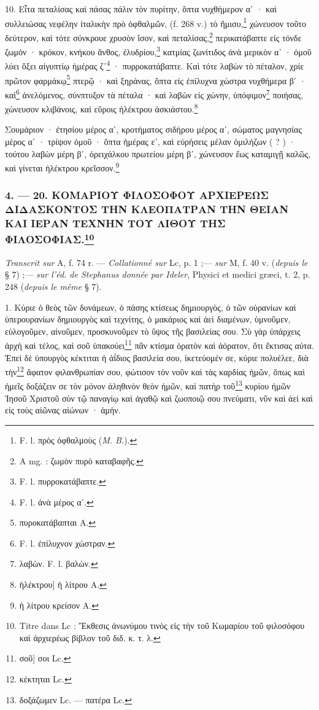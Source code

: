\documentclass[a4paper, 11pt, oneside, polutonikogreek, french]{article}
\begin{document}
10. Εἶτα πεταλίσας καὶ πάσας πάλιν τὸν πυρίτην, ὄπτα νυχθήμερον αʹ · καὶ συλλειώσας νεφέλην ἰταλικὴν πρὸ ὀφθαλμῶν, (f. 268 v.) τὸ ἥμισυ,\footnote{F. l. πρὸς ὀφθαλμοὺς (\emph{M. B.}).} χώνευσον τοῦτο δεύτερον, καὶ τότε σύνκρουε χρυσὸν ἴσον, καὶ πεταλίσας,\footnote{A mg. : ζωμὸν πυρὸ καταβαφῆς.} περικατάβαπτε εἰς τόνδε ζωμόν · κρόκον, κνήκου ἄνθος, ἐλυδρίου,\footnote{F. l. πυρροκατάβαπτε.} κατμίας ζωνίτιδος ἀνὰ μερικὸν αʹ · ὁμοῦ λύει ὄξει αἰγυπτίῳ ἡμέρας ζʹ\footnote{F. l. ἀνὰ μέρος αʹ.} · πυρροκατάβαπτε. Καὶ τότε λαβὼν τὸ πέταλον, χρίε πρῶτον φαρμάκῳ\footnote{πυροκατάβαπται A.} πτερῷ · καὶ ξηράνας, ὄπτα εἰς ἐπίλυχνα χώστρα νυχθήμερα βʹ · καὶ\footnote{F. l. ἐπίλυχνον χώστραν.} ἀνελόμενος, σύνπτυξον τὰ πέταλα · καὶ λαβὼν εἰς χώνην, ὑπόφιμον\footnote{λαβὼν. F. l. βαλὼν.} ποιήσας, χώνευσον κλιβάνοις, καὶ εὕροις ἠλέκτρου ἀσκιάστου.\footnote{ἠλέκτρου] ἡ λίτρου A.}

Σουμάριον · ἐτησίου μέρος αʹ, κροτήματος σιδήρου μέρος αʹ, σώματος μαγνησίας μέρος αʹ · τρίψον ὁμοῦ · ὄπτα ἡμέρας εʹ, καὶ εὑρήσεις μέλαν ὁμιλήζων ( ? ) · τούτου λαβὼν μέρη βʹ, ὀρειχάλκου πρωτείου μέρη βʹ, χώνευσον ἕως καταμιγῇ καλῶς, καὶ γίνεται ἠλέκτρου κρεῖσσον.\footnote{ἡ λίτρου κρείσον A.}

\bigskip
\centerline{\EightStarTaper}
\centerline{\EightStarTaper\EightStarTaper}
\bigskip

\subsubsection[4. --- 20. ΚΟΜΑΡΙΟΥ ΦΙΛΟΣΟΦΟΥ ΑΡΧΙΕΡΕΩΣ ΔΙΔΑΣΚΟΝΤΟΣ ΤΗΝ ΚΛΕΟΠΑΤΡΑΝ ΤΗΝ ΘΕΙΑΝ ΚΑΙ ΙΕΡΑΝ ΤΕΧΝΗΝ ΤΟΥ ΛΙΘΟΥ ΤΗΣ ΦΙΛΟΣΟΦΙΑΣ.]{4. --- 20. ΚΟΜΑΡΙΟΥ ΦΙΛΟΣΟΦΟΥ ΑΡΧΙΕΡΕΩΣ ΔΙΔΑΣΚΟΝΤΟΣ ΤΗΝ ΚΛΕΟΠΑΤΡΑΝ ΤΗΝ ΘΕΙΑΝ ΚΑΙ ΙΕΡΑΝ ΤΕΧΝΗΝ ΤΟΥ ΛΙΘΟΥ ΤΗΣ ΦΙΛΟΣΟΦΙΑΣ.\footnote{Titre dans Lc : Ἔκθεσις ἀνωνύμου τινὸς εἰς τὴν τοῦ Κωμαρίου τοῦ φιλοσόφου καὶ ἀρχιερέως βίβλον τοῦ διδ. κ. τ. λ.}}

\emph{Transcrit sur} A, f. 74 r. --- \emph{Collationné sur} Lc, p. 1 ;--- \emph{sur} M, f. 40 v. (\emph{depuis le} § 7) ;--- \emph{sur l'éd. de Stephanus donnée par Ideler}, Physici et medici græci, t. 2, p. 248 (\emph{depuis le même} § 7).

1. Κύριε ὁ θεὸς τῶν δυνάμεων, ὁ πάσης κτίσεως δημιουργὸς, ὁ τῶν οὐρανίων καὶ ὑπερουρανίων δημιουργὸς καὶ τεχνίτης, ὁ μακάριος καὶ ἀεὶ διαμένων, ὑμνοῦμεν, εὐλογοῦμεν, αἰνοῦμεν, προσκυνοῦμεν τὸ ὕψος τῆς βασιλείας σου. Σὺ γὰρ ὑπάρχεις ἀρχὴ καὶ τέλος, καὶ σοῦ ὑπακούει\footnote{σοῦ] σοι Lc.} πᾶν κτίσμα ὁρατὸν καὶ ἀόρατον, ὅτι ἔκτισας αὐτα. Ἐπεὶ δὲ ὑπουργὸς κέκτιται ἡ ἀΐδιος βασιλεία σου, ἰκετεύομέν σε, κύριε πολυέλεε, διὰ τὴν\footnote{κέκτηται Lc.} ἄφατον φιλανθρωπίαν σου, φώτισον τὸν νοῦν καὶ τὰς καρδίας ἡμῶν, ὅπως καὶ ἡμεῖς δοξάζειν σε τὸν μόνον ἀληθινὸν θεὸν ἡμῶν, καὶ πατὴρ τοῦ\footnote{δοξάζωμεν Lc. --- πατέρα Lc.} κυρίου ἡμῶν Ἰησοῦ Χριστοῦ σὺν τῷ παναγίῳ καὶ ἀγαθῷ καὶ ζωοποιῷ σου πνεύματι, νῦν καὶ ἀεὶ καὶ εἰς τοὺς αἰῶνας αἰώνων · ἀμήν.
\end{document}
